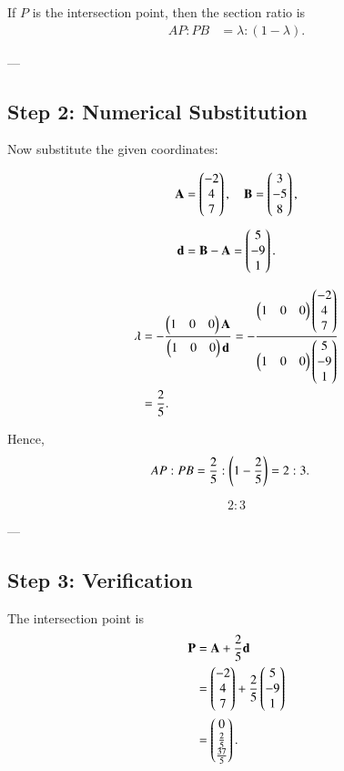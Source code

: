 \documentclass[journal]{IEEEtran}
\begin{document}
If $P$ is the intersection point, then the section ratio is
\begin{align}
AP : PB &= \lambda : (1-\lambda).
\end{align}

---

\subsection*{Step 2: Numerical Substitution}
Now substitute the given coordinates:

\begin{align}
\mathbf{A} &= \begin{pmatrix}-2 \\ 4 \\ 7\end{pmatrix}, \quad
\mathbf{B} = \begin{pmatrix}3 \\ -5 \\ 8\end{pmatrix}, \\[1ex]
\mathbf{d} &= \mathbf{B} - \mathbf{A} = \begin{pmatrix}5 \\ -9 \\ 1\end{pmatrix}.
\end{align}

\begin{align}
\lambda &= -\frac{\begin{pmatrix}1 & 0 & 0\end{pmatrix}\mathbf{A}}
{\begin{pmatrix}1 & 0 & 0\end{pmatrix}\mathbf{d}} 
= -\frac{\begin{pmatrix}1 & 0 & 0\end{pmatrix}\begin{pmatrix}-2 \\ 4 \\ 7\end{pmatrix}}
{\begin{pmatrix}1 & 0 & 0\end{pmatrix}\begin{pmatrix}5 \\ -9 \\ 1\end{pmatrix}} \\
&= \frac{2}{5}.
\end{align}

Hence,
\begin{align}
AP : PB &= \frac{2}{5} : \left(1-\frac{2}{5}\right) = 2:3.
\end{align}

\[
\boxed{2:3}
\]

---

\subsection*{Step 3: Verification}
The intersection point is
\begin{align}
\mathbf{P} &= \mathbf{A} + \frac{2}{5}\mathbf{d} \\
&= \begin{pmatrix}-2 \\ 4 \\ 7\end{pmatrix} + \frac{2}{5}\begin{pmatrix}5 \\ -9 \\ 1\end{pmatrix} \\
&= \begin{pmatrix}0 \\ \tfrac{2}{5} \\ \tfrac{37}{5}\end{pmatrix}.
\end{align}
\end{document}

